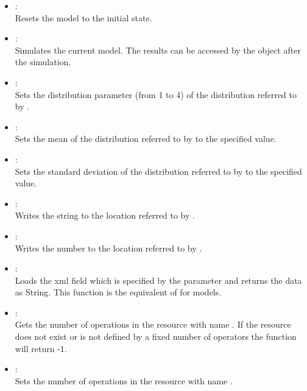 \begin{itemize}

\item
{}:\\
Resets the model to the initial state.

\item
{}:\\
Simulates the current model.
The results can be accessed by the  object after the simulation.

\item
{}:\\
Sets the distribution parameter  (from 1 to 4) of the distribution referred
to by .

\item
{}:\\
Sets the mean of the distribution referred to by  to the specified value.

\item
{}:\\
Sets the standard deviation of the distribution referred to by  to the specified value.  

\item
{}:\\
Writes the string  to the location referred to by .

\item
{}:\\
Writes the number  to the location referred to by .

\item
{}:\\
Loads the xml field which is specified by the parameter and returns the data 
as String. This function is the equivalent of  for models.

\item
{}:\\
Gets the number of operations in the resource with name .
If the resource does not exist or is not defined by a fixed number of operators
the function will return -1.

\item
{}:\\
Sets the number of operations in the resource with name .


\end{itemize}
